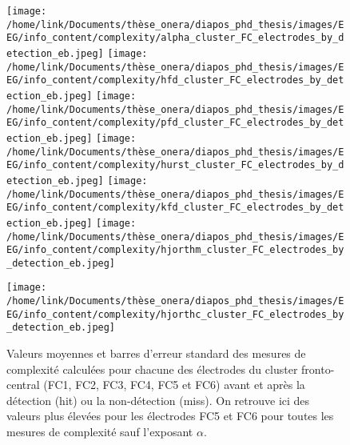 \begin{figure*}[!t]
\begin{multicols}{2}
\texttt{[image: /home/link/Documents/thèse\_onera/diapos\_phd\_thesis/images/EEG/info\_content/complexity/alpha\_cluster\_FC\_electrodes\_by\_detection\_eb.jpeg]}
\texttt{[image: /home/link/Documents/thèse\_onera/diapos\_phd\_thesis/images/EEG/info\_content/complexity/hfd\_cluster\_FC\_electrodes\_by\_detection\_eb.jpeg]}
\texttt{[image: /home/link/Documents/thèse\_onera/diapos\_phd\_thesis/images/EEG/info\_content/complexity/pfd\_cluster\_FC\_electrodes\_by\_detection\_eb.jpeg]}
\texttt{[image: /home/link/Documents/thèse\_onera/diapos\_phd\_thesis/images/EEG/info\_content/complexity/hurst\_cluster\_FC\_electrodes\_by\_detection\_eb.jpeg]}
\texttt{[image: /home/link/Documents/thèse\_onera/diapos\_phd\_thesis/images/EEG/info\_content/complexity/kfd\_cluster\_FC\_electrodes\_by\_detection\_eb.jpeg]}
\texttt{[image: /home/link/Documents/thèse\_onera/diapos\_phd\_thesis/images/EEG/info\_content/complexity/hjorthm\_cluster\_FC\_electrodes\_by\_detection\_eb.jpeg]}
\end{multicols}
\centering \texttt{[image: /home/link/Documents/thèse\_onera/diapos\_phd\_thesis/images/EEG/info\_content/complexity/hjorthc\_cluster\_FC\_electrodes\_by\_detection\_eb.jpeg]}
\caption[Valeurs des mesures de complexité calculées pour les électrodes du cluster FC]{Valeurs moyennes et barres d'erreur standard des mesures de complexité calculées pour chacune des électrodes du cluster fronto-central (FC1, FC2, FC3, FC4, FC5 et FC6) avant et après la détection (hit) ou la non-détection (miss). On retrouve ici des valeurs plus élevées pour les électrodes FC5 et FC6 pour toutes les mesures de complexité sauf l'exposant $\alpha$.}
\label{fig:figure5valeursmesurescomplexiteelectrode}
\end{figure*}

